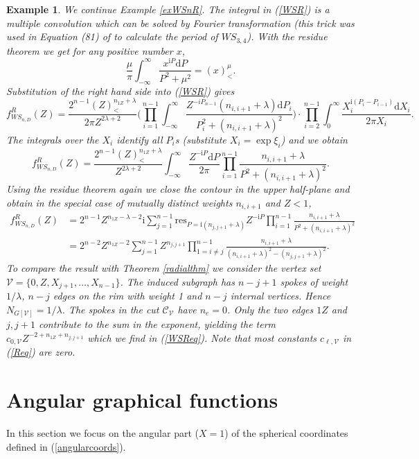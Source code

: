 \documentclass[oneside]{amsart}
\newcommand{\ii}{\mathrm{i}}
\newcommand{\dd}{\mathrm{d}}
\newcommand{\sC}{\mathcal{C}}
\newcommand{\sV}{\mathcal{V}}
\theoremstyle{plain}
\newtheorem{ex}[thm]{Example}
\begin{document}
\begin{ex}\label{exWSnR1}
We continue Example \ref{exWSnR}. The integral in (\ref{WSR}) is a multiple convolution which can be solved by Fourier transformation (this trick was used in Equation (81) of
\cite{Snatren} to calculate the period of $W\!S_{3,4}$). With the residue theorem we get for any positive number $x$,
$$
\frac{\mu}{\pi}\int_{-\infty}^\infty \frac{x^{\ii P}\dd P}{P^2+\mu^2}=(x)_<^\mu.
$$
Substitution of the right hand side into (\ref{WSR}) gives
$$
f_{W\!S_{n,D}}^R(Z)=\frac{2^{n-1}(Z)_<^{n_{1Z}+\lambda}}{2\pi Z^{2\lambda+2}}\Big(\prod_{i=1}^{n-1}\int_{-\infty}^\infty\frac{Z^{-iP_{n-1}}(n_{i,i+1}+\lambda)\dd P_i}
{P_i^2+(n_{i,i+1}+\lambda)^2}\Big)\cdot\prod_{i=2}^{n-1}\int_0^\infty\frac{X_i^{\ii(P_i-P_{i-1})}\dd X_i}{2\pi X_i}.
$$
The integrals over the $X_i$ identify all $P_i$s (substitute $X_i=\exp{\xi_i}$) and we obtain
\begin{equation}\label{WSReq0}
f_{W\!S_{n,D}}^R(Z)=\frac{2^{n-1}(Z)_<^{n_{1Z}+\lambda}}{Z^{2\lambda+2}}\int_{-\infty}^\infty\frac{Z^{-\ii P}\dd P}{2\pi}\prod_{i=1}^{n-1}\frac{n_{i,i+1}+\lambda}{P^2+(n_{i,i+1}+\lambda)^2}.
\end{equation}
Using the residue theorem again we close the contour in the upper half-plane and obtain in the special case of mutually distinct weights $n_{i,i+1}$ and $Z<1$,
\begin{align}\label{WSReq}
f_{W\!S_{n,D}}^R(Z)&=2^{n-1}Z^{n_{1Z}-\lambda-2}\ii\sum_{j=1}^{n-1}\mathrm{res}_{P=\ii(n_{j,j+1}+\lambda)}Z^{-\ii P}\prod_{i=1}^{n-1}
 \frac{n_{i,i+1}+\lambda}{P^2+(n_{i,i+1}+\lambda)^2}\nonumber\\
&=2^{n-2}Z^{n_{1Z}-2}\sum_{j=1}^{n-1}Z^{n_{j,j+1}}\prod_{1=i\neq j}^{n-1}\frac{n_{i,i+1}+\lambda}{(n_{i,i+1}+\lambda)^2-(n_{j,j+1}+\lambda)^2}.
\end{align}
To compare the result with Theorem \ref{radialthm} we consider the vertex set $\sV=\{0,Z,X_{j+1},\ldots,X_{n-1}\}$. The induced subgraph has $n-j+1$ spokes of weight $1/\lambda$,
$n-j$ edges on the rim with weight 1 and $n-j$ internal vertices. Hence $N_{G[\sV]}=1/\lambda$. The spokes in the cut $\sC_{\sV}$ have $n_e=0$. Only the two edges $1Z$ and $j,j+1$
contribute to the sum in the exponent, yielding the term $c_{0,\sV}Z^{-2+n_{1Z}+n_{j,j+1}}$ which we find in (\ref{WSReq}). Note that most constants $c_{\ell,\sV}$ in (\ref{Req}) are zero.
\end{ex}

\section{Angular graphical functions}\label{sectang}
In this section we focus on the angular part ($X=1$) of the spherical coordinates defined in (\ref{angularcoords}).
\end{document}
